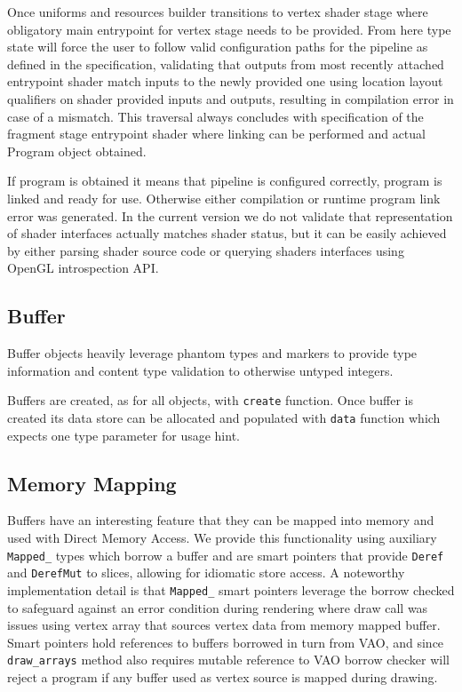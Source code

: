 Once uniforms and resources builder transitions to vertex shader stage where obligatory main entrypoint for vertex stage needs to be provided.
From here type state will force the user to follow valid configuration paths for the pipeline as defined in the specification, 
validating that outputs from most recently attached entrypoint shader match inputs to the newly provided one using location layout qualifiers 
on shader provided inputs and outputs, resulting in compilation error in case of a mismatch. 
This traversal always concludes with specification of the fragment stage entrypoint shader where linking can be performed and actual Program object obtained.

If program is obtained it means that pipeline is configured correctly, program is linked and ready for use. Otherwise either compilation or runtime program link error was generated.
In the current version we do not validate that representation of shader interfaces actually matches shader status, but it can be easily achieved 
by either parsing shader source code or querying shaders interfaces using OpenGL introspection API.

\subsection{Buffer}

Buffer objects heavily leverage phantom types and markers to provide type information and content type validation to otherwise untyped integers.

Buffers are created, as for all objects, with \texttt{create} function.
Once buffer is created its data store can be allocated and populated with \texttt{data} function which expects one type parameter for usage hint.

\subsection{Memory Mapping}

Buffers have an interesting feature that they can be mapped into memory and used with Direct Memory Access.
We provide this functionality using auxiliary \texttt{Mapped\_} types which borrow a buffer and are smart pointers that provide \texttt{Deref} and \texttt{DerefMut} to slices,
allowing for idiomatic store access.
A noteworthy implementation detail is that \texttt{Mapped\_} smart pointers leverage the borrow checked to safeguard against an error condition during rendering
where draw call was issues using vertex array that sources vertex data from memory mapped buffer. 
Smart pointers hold references to buffers borrowed in turn from VAO, and since \texttt{draw\_arrays} method also requires mutable reference to VAO borrow checker will reject
a program if any buffer used as vertex source is mapped during drawing.

